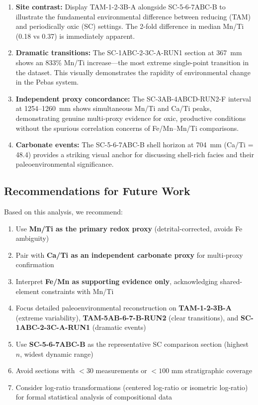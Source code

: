 \begin{enumerate}
\item \textbf{Site contrast:} Display TAM-1-2-3B-A alongside SC-5-6-7ABC-B to illustrate the fundamental environmental difference between reducing (TAM) and periodically oxic (SC) settings. The 2-fold difference in median Mn/Ti (0.18 vs 0.37) is immediately apparent.

\item \textbf{Dramatic transitions:} The SC-1ABC-2-3C-A-RUN1 section at 367~mm shows an 833\% Mn/Ti increase---the most extreme single-point transition in the dataset. This visually demonstrates the rapidity of environmental change in the Pebas system.

\item \textbf{Independent proxy concordance:} The SC-3AB-4ABCD-RUN2-F interval at 1254--1260~mm shows simultaneous Mn/Ti and Ca/Ti peaks, demonstrating genuine multi-proxy evidence for oxic, productive conditions without the spurious correlation concerns of Fe/Mn--Mn/Ti comparisons.

\item \textbf{Carbonate events:} The SC-5-6-7ABC-B shell horizon at 704~mm (Ca/Ti = 48.4) provides a striking visual anchor for discussing shell-rich facies and their paleoenvironmental significance.
\end{enumerate}

\subsection{Recommendations for Future Work}

Based on this analysis, we recommend:

\begin{enumerate}
\item Use \textbf{Mn/Ti as the primary redox proxy} (detrital-corrected, avoids Fe ambiguity)
\item Pair with \textbf{Ca/Ti as an independent carbonate proxy} for multi-proxy confirmation
\item Interpret \textbf{Fe/Mn as supporting evidence only}, acknowledging shared-element constraints with Mn/Ti
\item Focus detailed paleoenvironmental reconstruction on \textbf{TAM-1-2-3B-A} (extreme variability), \textbf{TAM-5AB-6-7-B-RUN2} (clear transitions), and \textbf{SC-1ABC-2-3C-A-RUN1} (dramatic events)
\item Use \textbf{SC-5-6-7ABC-B} as the representative SC comparison section (highest $n$, widest dynamic range)
\item Avoid sections with $<30$ measurements or $<100$ mm stratigraphic coverage
\item Consider log-ratio transformations (centered log-ratio or isometric log-ratio) for formal statistical analysis of compositional data
\end{enumerate}
